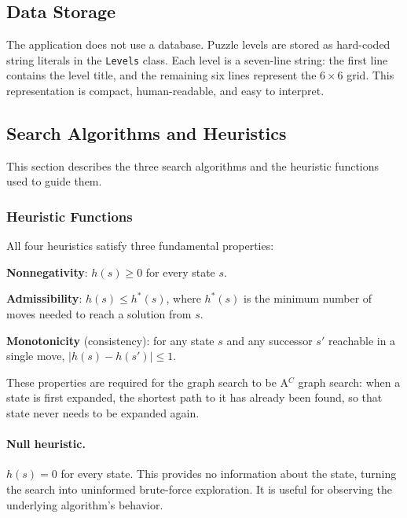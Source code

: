 \subsection{Data Storage}

The application does not use a database. Puzzle levels are stored as hard-coded string literals in the \texttt{Levels} class. Each level is a seven-line string: the first line contains the level title, and the remaining six lines represent the $6\times6$ grid. This representation is compact, human-readable, and easy to interpret.

\subsection{Search Algorithms and Heuristics}
\label{sec:algorithms}

This section describes the three search algorithms and the heuristic functions used to guide them.

\subsubsection{Heuristic Functions}

All four heuristics satisfy three fundamental properties:
\begin{compactitem}
\item \textbf{Nonnegativity}: $h(s) \geq 0$ for every state $s$.
\item \textbf{Admissibility}: $h(s) \leq h^*(s)$, where $h^*(s)$ is the minimum number of moves needed to reach a solution from $s$.
\item \textbf{Monotonicity} (consistency): for any state $s$ and any successor $s'$ reachable in a single move, $| h(s) - h(s') | \leq 1$.
\end{compactitem}

These properties are required for the graph search to be A$^C$ graph search: when a state is first expanded, the shortest path to it has already been found, so that state never needs to be expanded again.~\cite[p.~69, Theorem~4.3]{gregorics_2006_bevezetes} \cite[p.~16]{gregorics_grafker}

\paragraph{Null heuristic.} $h(s) = 0$ for every state. This provides no information about the state, turning the search into uninformed brute-force exploration. It is useful for observing the underlying algorithm's behavior.


